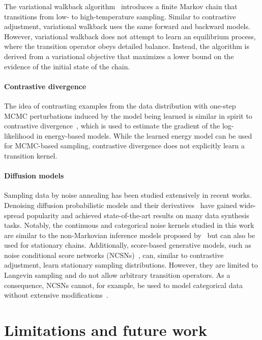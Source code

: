 \documentclass[10pt,twocolumn,letterpaper]{article}
\begin{document}
The variational walkback algorithm~\cite{goyal2017variational} introduces a finite Markov chain that transitions from low- to high-temperature sampling.
Similar to contrastive adjustment, variational walkback uses the same forward and backward models.
However, variational walkback does not attempt to learn an equilibrium process, where the transition operator obeys detailed balance.
Instead, the algorithm is derived from a variational objective that maximizes a lower bound on the evidence of the initial state of the chain.

\paragraph{Contrastive divergence}

The idea of contrasting examples from the data distribution with one-step MCMC perturbations induced by the model being learned is similar in spirit to contrastive divergence~\cite{hinton2002training}, which is used to estimate the gradient of the log-likelihood in energy-based models.
While the learned energy model can be used for MCMC-based sampling, contrastive divergence does not explicitly learn a transition kernel.

\paragraph{Diffusion models}

Sampling data by noise annealing has been studied extensively in recent works.
Denoising diffusion probabilistic models and their derivatives~\cite{sohl2015deep,ho2020denoising} have gained wide-spread popularity and achieved state-of-the-art results on many data synthesis tasks.
Notably, the continuous and categorical noise kernels studied in this work are similar to the non-Markovian inference models proposed by~\textcite{song2021denoising} but can also be used for stationary chains.
Additionally, score-based generative models, such as noise conditional score networks (NCSNs)~\cite{song2019generative}, can, similar to contrastive adjustment, learn stationary sampling distributions.
However, they are limited to Langevin sampling and do not allow arbitrary transition operators.
As a consequence, NCSNs cannot, for example, be used to model categorical data without extensive modifications~\cite{meng2022concrete}.


\section{Limitations and future work}
\end{document}
